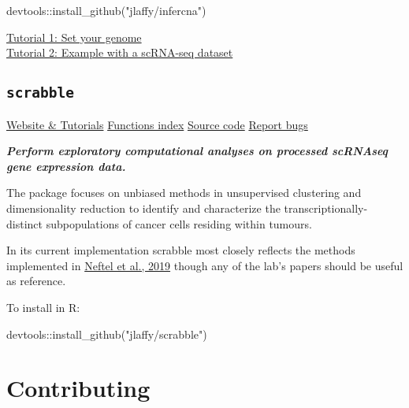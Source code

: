 \documentclass[
]{book}
\newenvironment{Shaded}{\begin{snugshade}}{\end{snugshade}}
\newcommand{\FunctionTok}[1]{\textcolor[rgb]{0.00,0.00,0.00}{#1}}
\newcommand{\NormalTok}[1]{#1}
\newcommand{\SpecialCharTok}[1]{\textcolor[rgb]{0.00,0.00,0.00}{#1}}
\newcommand{\StringTok}[1]{\textcolor[rgb]{0.31,0.60,0.02}{#1}}
\begin{document}
\begin{Shaded}
\begin{Highlighting}[]
\NormalTok{devtools}\SpecialCharTok{::}\FunctionTok{install\_github}\NormalTok{(}\StringTok{"jlaffy/infercna"}\NormalTok{)}
\end{Highlighting}
\end{Shaded}

\href{https://jlaffy.github.io/infercna/articles/useGenome.html}{Tutorial 1: Set your genome}\\
\href{https://jlaffy.github.io/infercna/articles/infercna_tutorial.html}{Tutorial 2: Example with a scRNA-seq dataset}

\hypertarget{scrabble}{%
\subsection{\texorpdfstring{\texttt{scrabble}}{scrabble}}\label{scrabble}}

\href{https://jlaffy.github.io/scrabble}{Website \& Tutorials} \textbar{} \href{https://jlaffy.github.io/scrabble/reference/index.html}{Functions index} \textbar{} \href{https://github.com/jlaffy/scrabble}{Source code} \textbar{} \href{https://github.com/jlaffy/scrabble/issues}{Report bugs}

\emph{\textbf{Perform exploratory computational analyses on processed scRNAseq gene expression data.}}

The package focuses on unbiased methods in unsupervised clustering and dimensionality reduction to identify and characterize the transcriptionally-distinct subpopulations of cancer cells residing within tumours.

In its current implementation scrabble most closely reflects the methods implemented in \href{https://www.ncbi.nlm.nih.gov/pubmed/31327527}{Neftel et al., 2019} though any of the lab's papers should be useful as reference.

To install in R:

\begin{Shaded}
\begin{Highlighting}[]
\NormalTok{devtools}\SpecialCharTok{::}\FunctionTok{install\_github}\NormalTok{(}\StringTok{"jlaffy/scrabble"}\NormalTok{)}
\end{Highlighting}
\end{Shaded}

\hypertarget{contributing}{%
\section{Contributing}\label{contributing}}
\end{document}
